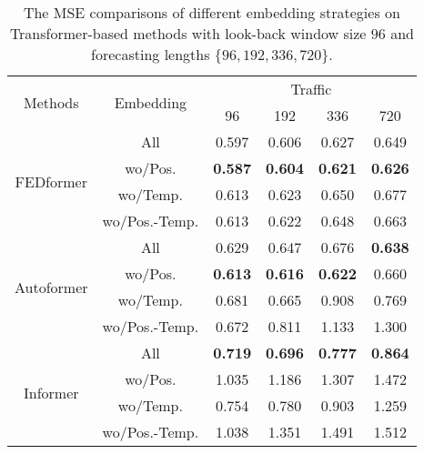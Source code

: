 \documentclass[10pt,twocolumn,letterpaper]{article}
\begin{document}
\begin{table}[h]
    \centering
\scalebox{0.85}
    {
            \begin{tabular}{c|c|cccc}
            \hline
            \multirow{2}{*}{Methods}    & \multirow{2}{*}{Embedding}                & \multicolumn{4}{c}{Traffic}                                   \\
                                         &                            & 96             & 192            & 336            & 720            \\\hline \hline
            \multirow{4}{*}{FEDformer}   & All                       & 0.597          & 0.606          & 0.627          & 0.649          \\
                                         & wo/Pos.                   & \textbf{0.587} & \textbf{0.604} & \textbf{0.621} & \textbf{0.626} \\
                                         & wo/Temp.                  & 0.613          & 0.623          & 0.650          & 0.677          \\
                                         & wo/Pos.-Temp.             & 0.613          & 0.622          & 0.648          & 0.663          \\\hline\hline
            \multirow{4}{*}{Autoformer}  & All              & 0.629          & 0.647          & 0.676          & \textbf{0.638} \\
                                         & wo/Pos.          & \textbf{0.613} & \textbf{0.616} & \textbf{0.622} & 0.660          \\
                                         & wo/Temp.         & 0.681          & 0.665          & 0.908          & 0.769          \\
                                         & wo/Pos.-Temp.    & 0.672          & 0.811          & 1.133          & 1.300          \\\hline\hline
            \multirow{4}{*}{Informer}    & All              & \textbf{0.719} & \textbf{0.696} & \textbf{0.777} & \textbf{0.864}          \\
                                         & wo/Pos.          & 1.035          & 1.186          & 1.307          & 1.472          \\
                                         & wo/Temp.         & 0.754          & 0.780          & 0.903          & 1.259 \\
                                         & wo/Pos.-Temp.    & 1.038          & 1.351          & 1.491          & 1.512         
             \\\hline
            \end{tabular}
            }
            \vspace{-0.3cm}
            \caption{The MSE comparisons of different embedding strategies on Transformer-based methods with look-back window size $96$ and forecasting lengths $\{96,192,336,720\}$. }
\label{tab:embedding}
\vspace{-0.5cm}
\end{table}      
            
\end{document}
